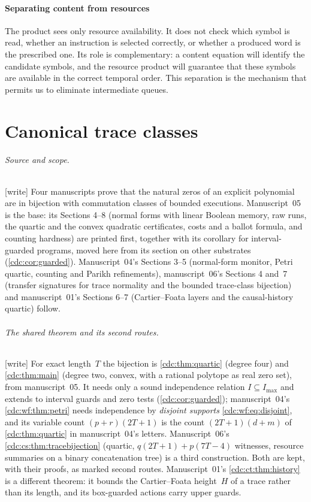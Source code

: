 \documentclass[11pt,a4paper]{article}
\theoremstyle{definition}
\theoremstyle{remark}
\newcommand{\wtag}{\textup{[write]}}%
\begin{document}
\subsection{Separating content from resources}
The product sees only resource availability. It does not check which symbol is read, whether an instruction is selected correctly, or whether a produced word is the prescribed one. Its role is complementary: a content equation will identify the candidate symbols, and the resource product will guarantee that these symbols are available in the correct temporal order. This separation is the mechanism that permits us to eliminate intermediate queues.


\part{Canonical trace classes}\label{cdc:part:traces}

\paragraph{Source and scope.} \wtag{} Four manuscripts prove that the natural zeros of an explicit polynomial are in bijection with commutation classes of bounded executions. Manuscript~05 is the base: its Sections 4--8 (normal forms with linear Boolean memory, raw runs, the quartic and the convex quadratic certificates, costs and a ballot formula, and counting hardness) are printed first, together with its corollary for interval-guarded programs, moved here from its section on other substrates (\cref{cdc:cor:guarded}). Manuscript~04's Sections 3--5 (normal-form monitor, Petri quartic, counting and Parikh refinements), manuscript~06's Sections 4 and~7 (transfer signatures for trace normality and the bounded trace-class bijection) and manuscript~01's Sections 6--7 (Cartier--Foata layers and the causal-history quartic) follow.

\paragraph{The shared theorem and its second routes.} \wtag{} For exact length~$T$ the bijection is \cref{cdc:thm:quartic} (degree four) and \cref{cdc:thm:main} (degree two, convex, with a rational polytope as real zero set), from manuscript~05. It needs only a sound independence relation $I\subseteq I_{\max}$ and extends to interval guards and zero tests (\cref{cdc:cor:guarded}); manuscript~04's \cref{cdc:wf:thm:petri} needs independence by \emph{disjoint supports} \eqref{cdc:wf:eq:disjoint}, and its variable count $(p+r)(2T+1)$ is the count $(2T+1)(d+m)$ of \cref{cdc:thm:quartic} in manuscript~04's letters. Manuscript~06's \cref{cdc:cs:thm:tracebijection} (quartic, $q(2T+1)+p(7T-4)$ witnesses, resource summaries on a binary concatenation tree) is a third construction. Both are kept, with their proofs, as marked second routes. Manuscript~01's \cref{cdc:ct:thm:history} is a different theorem: it bounds the Cartier--Foata height~$H$ of a trace rather than its length, and its box-guarded actions carry upper guards.
\end{document}
